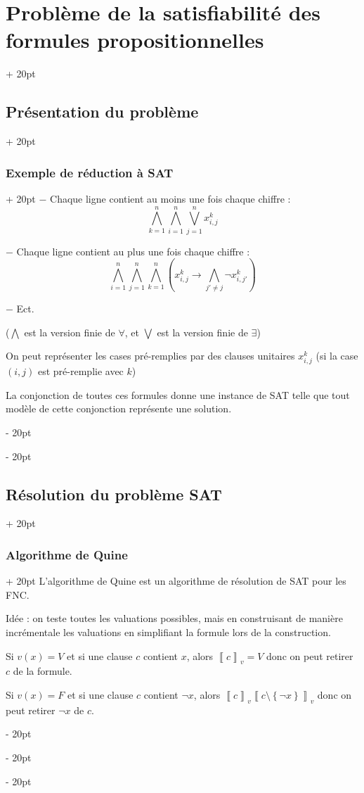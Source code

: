 \documentclass[a4paper, 12pt, twoside]{article}
\newcommand{\lr}[1]{\left( #1 \right)}
\newcommand{\lrbb}[1]{\left\llbracket #1 \right\rrbracket}
\newcommand{\set}[1]{\left\{ #1 \right\}}
\newcommand{\ind}[1][20pt]{\advance\leftskip + #1}
\newcommand{\deind}[1][20pt]{\advance\leftskip - #1}
\newenvironment{indt}[2][20pt]{#2 \par \ind[#1]}{\par \deind} %
\begin{document}
\begin{indt}{\section{Problème de la satisfiabilité des formules propositionnelles}}
\begin{indt}{\subsection{Présentation du problème}}
\begin{indt}{\subsubsection{Exemple de réduction à SAT}}
                $-$ Chaque ligne contient au moins une fois chaque chiffre :
                    \[ \bigwedge_{k = 1}^n \bigwedge_{i = 1}^n \bigvee_{j = 1}^n x_{i, j}^k  \]
                
                $-$ Chaque ligne contient au plus une fois chaque chiffre :
                    \[ \bigwedge_{i = 1}^n \bigwedge_{j = 1}^n \bigwedge_{k = 1}^n \lr{x_{i, j}^k \rightarrow \bigwedge_{j' \neq j} \neg x_{i, j'}^k} \]
                
                $-$ Ect.
                
                ($\bigwedge$ est la version finie de $\forall$, et $\bigvee$ est la version finie de $\exists$)
                
                \vspace{12pt}
                
                On peut représenter les cases pré-remplies par des clauses unitaires $x_{i, j}^k$ (si la case $(i, j)$ est pré-remplie avec $k$)
                
                La conjonction de toutes ces formules donne une instance de SAT telle que tout modèle de cette conjonction représente une solution.
            \end{indt}
        \end{indt}
        
        \begin{indt}{\subsection{Résolution du problème SAT}}
            \begin{indt}{\subsubsection{Algorithme de Quine}}
                L'algorithme de Quine est un algorithme de résolution de SAT pour les FNC.
                
                Idée : on teste toutes les valuations possibles, mais en construisant de manière incrémentale les valuations en simplifiant la formule lors de la construction.
                
                Si $v(x) = V$ et si une clause $c$ contient $x$, alors $\lrbb c _v = V$ donc on peut retirer $c$ de la formule.
                
                Si $v(x) = F$ et si une clause $c$ contient $\neg x$, alors $\lrbb c _v \lrbb{c \setminus \set{\neg x}}_v$ donc on peut retirer $\neg x$ de $c$.
                

\end{indt}
\end{indt}
\end{indt}
\end{document}
